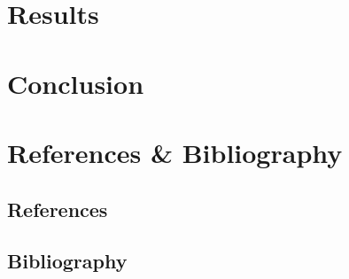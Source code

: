 \documentclass{article}
\begin{document}
	
	\section{Results}
	
	
	\section{Conclusion}
	
	
	\section{References \& Bibliography}
	\subsection*{References}
	\subsection*{Bibliography}
\end{document}
